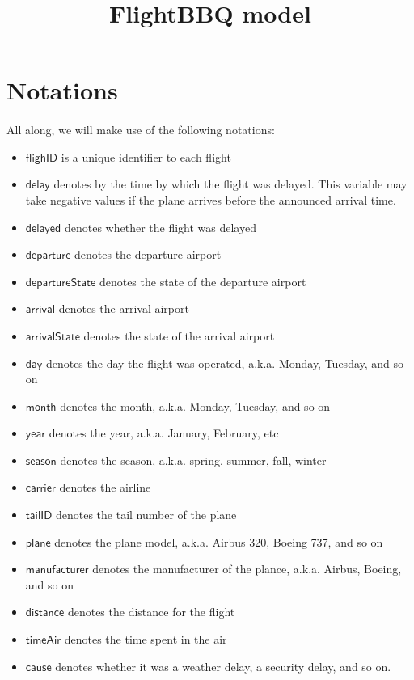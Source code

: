\documentclass[a4paper]{article}
\title{FlightBBQ model}
\begin{document}
\maketitle

\section{Notations}

\paragraph{}
All along, we will make use of the following notations:
\begin{itemize}
\item $\mathsf{flighID}$ is a unique identifier to each flight
\item $\mathsf{delay}$ denotes by the time by which the flight was delayed. This variable may take negative values if the plane arrives before the announced arrival time. 
\item $\mathsf{delayed}$ denotes whether the flight was delayed
\item $\mathsf{departure}$ denotes the departure airport
\item $\mathsf{departureState}$ denotes the state of the departure airport
\item $\mathsf{arrival}$ denotes the arrival airport
\item $\mathsf{arrivalState}$ denotes the state of the arrival airport
\item $\mathsf{day}$ denotes the day the flight was operated, a.k.a. Monday, Tuesday, and so on
\item $\mathsf{month}$ denotes the month, a.k.a. Monday, Tuesday, and so on
\item $\mathsf{year}$ denotes the year, a.k.a. January, February, etc
\item $\mathsf{season}$ denotes the season, a.k.a. spring, summer, fall, winter
\item $\mathsf{carrier}$ denotes the airline
\item $\mathsf{tailID}$ denotes the tail number of the plane
\item $\mathsf{plane}$ denotes the plane model, a.k.a. Airbus 320, Boeing 737, and so on
\item $\mathsf{manufacturer}$  denotes the manufacturer of the plance, a.k.a. Airbus, Boeing, and so on
\item $\mathsf{distance}$ denotes the distance for the flight
\item $\mathsf{timeAir}$ denotes the time spent in the air
\item $\mathsf{cause}$ denotes whether it was a weather delay, a security delay, and so on.
\end{itemize}
\end{document}
